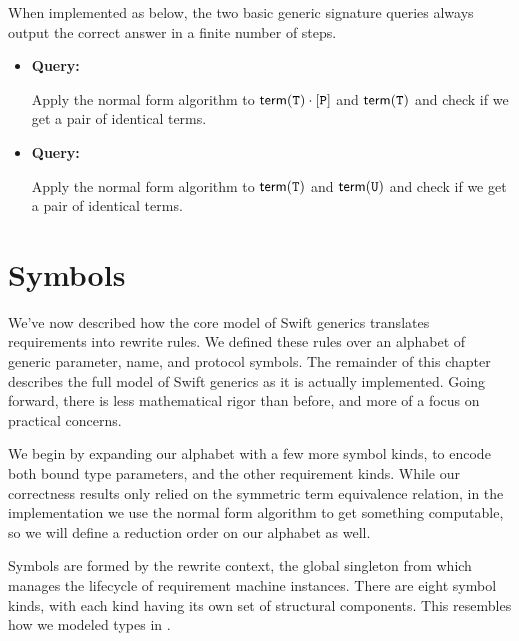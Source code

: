 \documentclass[../generics]{subfiles}
\begin{document}
\begin{mdframed}[leftline=false,rightline=false,linecolor=black,linewidth=2pt]
When implemented as below, the two basic generic signature queries always output the correct answer in a finite number of steps.
\begin{itemize}
\item \textbf{Query:} 

Apply the normal form algorithm to $\mathsf{term}(\texttt{T})\cdot[\texttt{P}]$ and $\mathsf{term}(\texttt{T})$ and check if we get a pair of identical terms.

\item \textbf{Query:} 

Apply the normal form algorithm to $\mathsf{term}(\texttt{T})$ and $\mathsf{term}(\texttt{U})$ and check if we get a pair of identical terms.
\end{itemize}
\end{mdframed}

\section{Symbols}\label{rqm symbols}

We've now described how the core model of Swift generics translates requirements into rewrite rules. We defined these rules over an alphabet of generic parameter, name, and protocol symbols. The remainder of this chapter describes the full model of Swift generics as it is actually implemented. Going forward, there is less mathematical rigor than before, and more of a focus on practical concerns.

We begin by expanding our alphabet with a few more symbol kinds, to encode both bound type parameters, and the other requirement kinds. While our correctness results only relied on the symmetric term equivalence relation, in the implementation we use the normal form algorithm to get something computable, so we will define a reduction order on our alphabet as well.

Symbols are formed by the rewrite context, the global singleton from  which manages the lifecycle of requirement machine instances. There are eight symbol kinds, with each kind having its own set of structural components. This resembles how we modeled types in .
\end{document}

